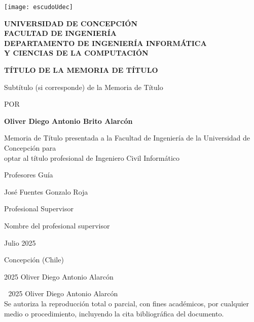 \documentclass[12pt,twoside]{report}
\begin{document}
\pagestyle{empty}

\begin{titlepage}
    \texttt{[image: escudoUdec]}
    \begin{minipage}[b][60pt][c]{70ex}
    	\bfseries
        UNIVERSIDAD DE CONCEPCIÓN\\
        FACULTAD DE INGENIERÍA\\
        DEPARTAMENTO DE INGENIERÍA INFORMÁTICA\\
        Y CIENCIAS DE LA COMPUTACIÓN
    \end{minipage}
    \vspace{3cm}
    
    \begin{center}	
        \uppercase{\large\textbf{Título de la memoria de título}}

        \bigskip
        Subtítulo (si corresponde) de la Memoria de Título

        \vspace{1.5cm}
        POR
        \bigskip

        \textbf{Oliver Diego Antonio Brito Alarcón}

        \vspace{2cm}
        {\small Memoria de Título presentada a la Facultad de Ingeniería de la Universidad de Concepción para\\
        optar al título profesional de Ingeniero Civil Informático}
	
        \vspace{2cm}	
        Profesores Guía

        José Fuentes
        Gonzalo Roja

        \bigskip
        Profesional Supervisor

        Nombre del profesional supervisor

        \vfill
        Julio 2025

        Concepción (Chile)
        
        \bigskip
        \textcopyright{}
        2025 Oliver Diego Antonio Alarcón
	\end{center}
\end{titlepage}

\textcolor{white}{.}
\vfill
\noindent\textcopyright{}
2025 Oliver Diego Antonio Alarcón\\
Se autoriza la reproducción total o parcial, con fines académicos, por cualquier medio o procedimiento, incluyendo la cita bibliográfica del documento.
\end{document}
